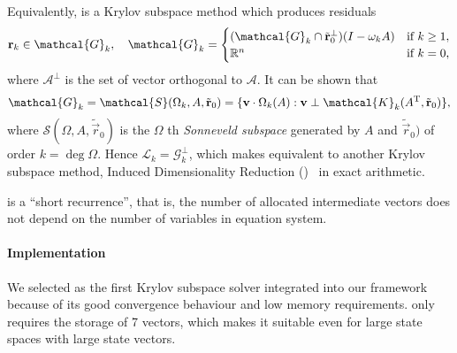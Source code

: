 Equivalently,  is a Krylov subspace method which
produces residuals
\begin{equation}
  \label{eq:algorithms:bicgstab:sonneveld}
  \vec{r}_k \in \mathcal{G}_k, \quad
  \mathcal{G}_k = \begin{cases}
    (\mathcal{G}_{k} \cap \tilde{\vec{r}}_0^{\perp}) (I - \omega_k
    A) & \text{if $k \ge 1$}, \\
    \RR^n & \text{if $k = 0$,}
  \end{cases}
\end{equation}
where $\mathcal{A}^{\perp}$ is the set of vector orthogonal to
$\mathcal{A}$. It can be shown that%
~\citep{sleijpen2010exploiting}
\begin{equation}
  \mathcal{G}_k = \mathcal{S}(\Omega_k, A, \tilde{\vec{r}}_0) = \{
  \vec{v} \cdot \Omega_k(A) : \vec{v} \perp \mathcal{K}_k(A^\T,
  \tilde{\vec{r}}_0) \} \text,
\end{equation}
where $\mathcal{S}(\Omega, A, \tilde{\vec{r}}_0)$ is the
$\Omega$\kern0.5pt th \emph{Sonneveld subspace} generated by $A$ and
$\tilde{\vec{r}}_0)$ of order $k = \deg \Omega$. Hence
$\mathcal{L}_k = \mathcal{G}_k^{\perp}$, which makes 
equivalent to another Krylov subspace method, Induced Dimensionality
Reduction ()~\citep{sleijpen2010exploiting} in exact
arithmetic.

 is a ``short recurrence'', that is, the number of
allocated intermediate vectors does not depend on the number of
variables in equation system.

\paragraph{Implementation}

We selected  as the first Krylov subspace solver
integrated into our framework because of its good convergence
behaviour and low memory requirements.  only requires
the storage of 7 vectors, which makes it suitable even for large state
spaces with large state vectors.

